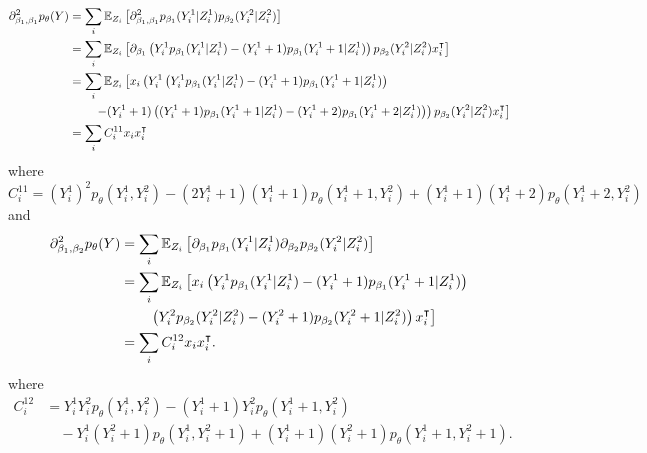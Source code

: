 \begin{align*}
  \partial^2_{\beta_1, \beta_1} p_\theta(Y) 
  & = \sum_i \mathbb E_{Z_i} \left[ \partial^2_{\beta_1, \beta_1} p_{\beta_1}(Y_i^1|Z_i^1) p_{\beta_2}(Y_i^2|Z_i^2) \right] \\
  & = \sum_i \mathbb E_{Z_i} \left[ \partial_{\beta_1} \left( Y_i^1 p_{\beta_1}(Y_i^1|Z_i^1) - (Y_i^1 +1)p_{\beta_1}(Y_i^1+1|Z_i^1) \right) p_{\beta_2}(Y_i^2|Z_i^2) x_i^\intercal \right] \\
  & = \sum_i \mathbb E_{Z_i} \left[ x_i \left( Y_i^1 \left( Y_i^1 p_{\beta_1}(Y_i^1|Z_i^1) - (Y_i^1 +1)p_{\beta_1}(Y_i^1+1|Z_i^1) \right) \right. \right. \\
  & \qquad \left. \left. - (Y_i^1 +1) \left( (Y_i^1+1) p_{\beta_1}(Y_i^1+1|Z_i^1) - (Y_i^1 +2)p_{\beta_1}(Y_i^1+2|Z_i^1) \right) \right) p_{\beta_2}(Y_i^2|Z_i^2) x_i^\intercal \right] \\
  & = \sum_i C_i^{11} x_i x_i^\intercal
\end{align*}
where 
$$
C_i^{11} = (Y_i^1)^2 p_\theta(Y_i^1, Y_i^2) - (2 Y_i^1+1) (Y_i^1+1) p_\theta(Y_i^1+1, Y_i^2) + (Y_i^1+1) (Y_i^1+2) p_\theta(Y_i^1+2, Y_i^2)
$$
and 
\begin{align*}
  \partial^2_{\beta_1, \beta_2}p_\theta(Y) 
  & = \sum_i \mathbb E_{Z_i} \left[ \partial_{\beta_1} p_{\beta_1}(Y_i^1|Z_i^1) \partial_{\beta_2} p_{\beta_2}(Y_i^2|Z_i^2) \right] \\
  & = \sum_i \mathbb E_{Z_i} \left[ 
  x_i \left( Y_i^1 p_{\beta_1}(Y_i^1|Z_i^1) - (Y_i^1 +1)p_{\beta_1}(Y_i^1+1|Z_i^1) \right) \right. \\
  & \qquad \left. \left( Y_i^2 p_{\beta_2}(Y_i^2|Z_i^2) - (Y_i^2 +1)p_{\beta_2}(Y_i^2+1|Z_i^2) \right) x_i ^\intercal \right] \\
  & = \sum_i C_i^{12}  x_i x_i^\intercal.
\end{align*}
where
\begin{align*}
 C_i^{12} 
 & = Y_i^1 Y_i^2 p_\theta(Y_i^1, Y_i^2) - (Y_i^1+1) Y_i^2 p_\theta(Y_i^1+1, Y_i^2) \\
 & \quad - Y_i^1 (Y_i^2+1) p_\theta(Y_i^1, Y_i^2+1) + (Y_i^1+1) (Y_i^2+1) p_\theta(Y_i^1+1, Y_i^2+1).
\end{align*}

